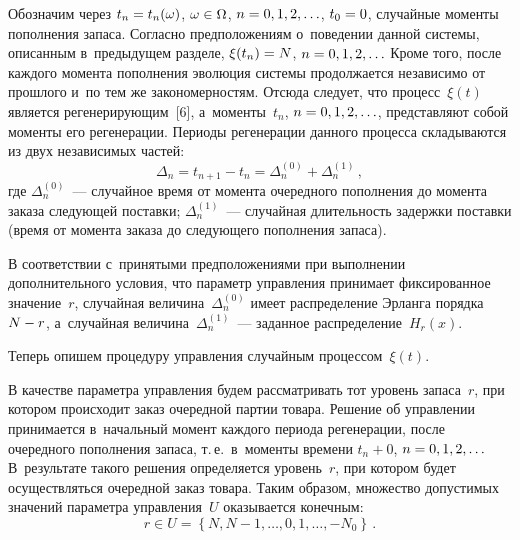\begin{multicols}{2}
  Обозначим через $t_n\hm= t_n(\omega)$, $\omega\hm\in \Omega$, $n\hm=0, 1, 
2, \ldots $, $t_0\hm=0$, случайные моменты пополнения запаса. Согласно 
предположениям о~поведении данной сис\-те\-мы, описанным в~предыду\-щем 
разделе, $\xi(t_n)\hm= N$, $n\hm=0,1,2,\ldots$ Кроме того, после каж\-до\-го 
момента пополнения эволюция сис\-те\-мы продолжается независимо от прош\-ло\-го и~по тем же закономерностям. Отсюда следует, что процесс~$\xi(t)$ является 
ре\-ге\-не\-ри\-ру\-ющим~[6], а~моменты~$t_n$, $n\hm=0,1,2,\ldots$, представляют 
собой моменты его регенерации. Периоды регенерации данного процесса 
складываются из двух независимых час\-тей:
  \begin{equation}
  \Delta_n=t_{n+1}-t_n =\Delta_n^{(0)}+\Delta_n^{(1)}\,,
  \label{e1-sk}
  \end{equation}
где $\Delta_n^{(0)}$~--- случайное время от момента очередного пополнения до 
момента заказа следующей по\-став\-ки;  $\Delta_n^{(1)}$~--- случайная 
дли\-тель\-ность задержки по\-став\-ки (время от момента заказа до сле\-ду\-юще\-го 
пополнения запаса).

  В соответствии с~принятыми предположениями при выполнении 
дополнительного условия, что параметр управ\-ле\-ния принимает фиксированное 
значение~$r$, случайная величина~$\Delta_n^{(0)}$ имеет распределение 
Эрланга порядка $N\hm-r$, а~случайная величина~$\Delta_n^{(1)}$~--- 
заданное распределение~$H_r(x)$. 
  
  Теперь опишем процедуру управ\-ле\-ния случайным процессом~$\xi(t)$.
  
  В качестве параметра управления будем рас\-смат\-ри\-вать тот уровень 
запаса~$r$, при котором происходит заказ очередной партии товара. Решение 
об управлении принимается в~начальный момент каждого периода регенерации, 
после очередного пополнения запаса, т.\,е.\ в~моменты времени $t_n+0$, 
$n\hm=0,1,2,\ldots$ В~результате такого решения определяется уровень~$r$, 
при котором будет осуществляться очередной заказ товара. Таким образом, 
множество допустимых значений па\-ра\-мет\-ра управ\-ле\-ния~$U$ оказывается 
конечным:
  $$
  r\in U=\left\{ N, N-1, \ldots , 0, 1, \ldots,  -N_0\right\}\,.
  $$
  

\end{multicols}
